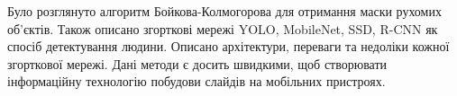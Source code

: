 \chapterConclusion

Було розглянуто алгоритм Бойкова-Колмогорова для
отримання маски рухомих об'єктів. Також описано
згорткові мережі YOLO, MobileNet, SSD, R-CNN
як спосіб детектування людини. 
Описано архітектури, переваги та недоліки кожної 
згорткової мережі.
Дані методи є досить швидкими, щоб 
створювати інформаційну технологію побудови слайдів на 
мобільних пристроях.